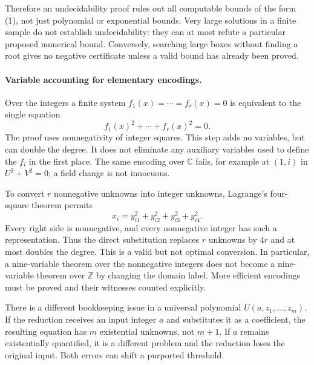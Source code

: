 \documentclass[11pt]{article}
\begin{document}
Therefore an undecidability proof rules out all computable bounds of
the form (1), not just polynomial or exponential bounds. Very large
solutions in a finite sample do not establish undecidability: they
can at most refute a particular proposed numerical bound. Conversely,
searching large boxes without finding a root gives no negative
certificate unless a valid bound has already been proved.

\paragraph{Variable accounting for elementary encodings.}
Over the integers a finite system $f_1(x)=\cdots=f_r(x)=0$ is
equivalent to the single equation
\[
 f_1(x)^2+\cdots+f_r(x)^2=0.                           \tag{2}
\]
The proof uses nonnegativity of integer squares. This step adds no
variables, but can double the degree. It does not eliminate any
auxiliary variables used to define the $f_i$ in the first place.
The same encoding over $\mathbb C$ fails, for example at $(1,i)$
in $U^2+V^2=0$; a field change is not innocuous.

To convert $r$ nonnegative unknowns into integer unknowns, Lagrange's
four-square theorem permits
\[
 x_i=y_{i1}^2+y_{i2}^2+y_{i3}^2+y_{i4}^2.
                                                        \tag{3}
\]
Every right side is nonnegative, and every nonnegative integer has
such a representation. Thus the direct substitution replaces $r$
unknowns by $4r$ and at most doubles the degree. This is a valid but
not optimal conversion. In particular, a nine-variable theorem over
the nonnegative integers does not become a nine-variable theorem over
$\mathbb Z$ by changing the domain label. More efficient encodings
must be proved and their witnesses counted explicitly.

There is a different bookkeeping issue in a universal polynomial
$U(a,z_1,\ldots,z_m)$. If the reduction receives an input integer
$a$ and substitutes it as a coefficient, the resulting equation has
$m$ existential unknowns, not $m+1$. If $a$ remains existentially
quantified, it is a different problem and the reduction loses the
original input. Both errors can shift a purported threshold.
\end{document}
